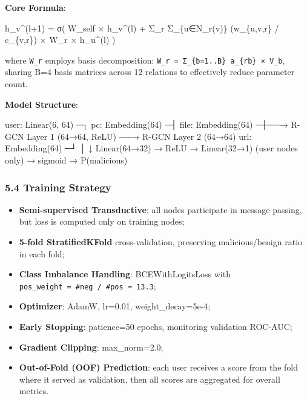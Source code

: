 \documentclass[
  a4paper,
  11pt]{article}
\newenvironment{Shaded}{}{}
\newcommand{\NormalTok}[1]{#1}
\providecommand{\tightlist}{%
  \setlength{\itemsep}{0pt}\setlength{\parskip}{0pt}}
\begin{document}
\textbf{Core Formula}:

\begin{Shaded}
\begin{Highlighting}[]
\NormalTok{h\_v\^{}(l+1) = σ( W\_self × h\_v\^{}(l) + Σ\_r Σ\_\{u∈N\_r(v)\} (w\_\{u,v,r\} / c\_\{v,r\}) × W\_r × h\_u\^{}(l) )}
\end{Highlighting}
\end{Shaded}

where \texttt{W\_r} employs basis decomposition:
\texttt{W\_r\ =\ Σ\_\{b=1..B\}\ a\_\{rb\}\ ×\ V\_b}, sharing B=4 basis
matrices across 12 relations to effectively reduce parameter count.

\textbf{Model Structure}:

\begin{Shaded}
\begin{Highlighting}[]
\NormalTok{user: Linear(6, 64)  ─┐}
\NormalTok{pc:   Embedding(64)   ─┤}
\NormalTok{file: Embedding(64)   ─┼──→ R{-}GCN Layer 1 (64→64, ReLU) ──→ R{-}GCN Layer 2 (64→64)}
\NormalTok{url:  Embedding(64)   ─┘                                          │}
\NormalTok{                                                                   ↓}
\NormalTok{                                                    Linear(64→32) → ReLU → Linear(32→1)}
\NormalTok{                                                    (user nodes only)    → sigmoid → P(malicious)}
\end{Highlighting}
\end{Shaded}

\subsubsection{5.4 Training Strategy}\label{54-training-strategy}

\begin{itemize}
\tightlist
\item
  \textbf{Semi-supervised Transductive}: all nodes participate in
  message passing, but loss is computed only on training nodes;
\item
  \textbf{5-fold StratifiedKFold} cross-validation, preserving
  malicious/benign ratio in each fold;
\item
  \textbf{Class Imbalance Handling}: BCEWithLogitsLoss with
  \texttt{pos\_weight\ =\ \#neg\ /\ \#pos\ ≈\ 13.3};
\item
  \textbf{Optimizer}: AdamW, lr=0.01, weight\_decay=5e-4;
\item
  \textbf{Early Stopping}: patience=50 epochs, monitoring validation
  ROC-AUC;
\item
  \textbf{Gradient Clipping}: max\_norm=2.0;
\item
  \textbf{Out-of-Fold (OOF) Prediction}: each user receives a score from
  the fold where it served as validation, then all scores are aggregated
  for overall metrics.
\end{itemize}
\end{document}
